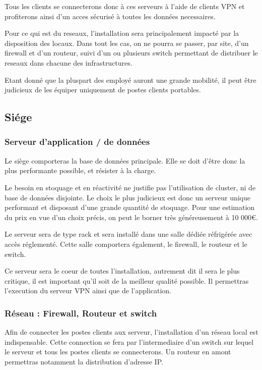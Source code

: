     Tous les clients se connecterons donc à ces serveurs à l'aide de clients VPN et profiterons ainsi d'un acces sécurisé à toutes les données necessaires.

    Pour ce qui est du reseaux, l'installation sera principalement impacté par la disposition des locaux.
    Dans tout les cas, on ne pourra se passer, par site, d'un firewall et d'un routeur, suivi d'un ou plusieurs switch permettant de distribuer le reseaux dans chacune des infrastructures.

    Etant donné que la pluspart des employé auront une grande mobilité, il peut être judicieux de les équiper uniquement de postes clients portables.


    \subsection{Siége}

        \subsubsection{Serveur d'application / de données}
            Le siège comporteras la base de données principale. Elle se doit d'être donc la plus performante possible, et résister à la charge.

            Le besoin en stoquage et en réactivité ne justifie pas l'utilisation de cluster, ni de base de données disjointe.
            Le choix le plus judicieux est donc un serveur unique performant et disposant d'une grande quantité de stoquage.
            Pour une estimation du prix en vue d'un choix précis, on peut le borner très généreusement à 10 000€.

            Le serveur sera de type rack et sera installé dans une salle dédiée réfrigérée avec accès réglementé.
            Cette salle comportera également, le firewall, le routeur et le switch.

            Ce serveur sera le coeur de toutes l'installation, autrement dit il sera le plus critique, il est important qu'il soit de la meilleur qualité possible.
            Il permettras l'execution du serveur VPN ainsi que de l'application.

        \subsubsection{Réseau : Firewall, Routeur et switch}
            Afin de connecter les postes clients aux serveur, l'installation d'un réseau local est indispensable.
            Cette connection se fera par l'intermediaire d'un switch sur lequel le serveur et tous les postes clients se connecterons.
            Un routeur en amont permettras notamment la distribution d'adresse IP.

